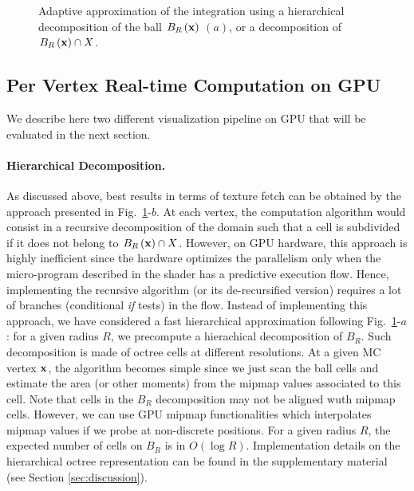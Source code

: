 \documentclass{llncs}
\begin{document}
\begin{figure}
  \begin{center}
  \end{center}
  \caption{Adaptive approximation of the integration using a
    hierarchical decomposition of the ball $B_{R}\left(\mathbf{x}\right)$ $(a)$, or a decomposition of $B_{R}\left(\mathbf{x}\right)\cap X$.}
  \label{fig:approx2}
\end{figure}


\subsection{Per Vertex Real-time Computation on GPU}

We describe here two different visualization pipeline on GPU that will
be evaluated in the next section.



\paragraph{Hierarchical Decomposition.}  As discussed above, best
results in terms of texture fetch can be obtained by the approach
presented in Fig.~\ref{fig:approx2}-$b$. At each vertex, the
computation algorithm would consist in a recursive decomposition of
the domain such that a cell is subdivided if it does not belong to
$B_{R}\left(\mathbf{x}\right)\cap X$. However, on GPU hardware, this approach is
highly inefficient since the hardware optimizes the parallelism only
when the micro-program described in the shader has a predictive
execution flow. Hence, implementing the recursive algorithm (or its
de-recursified version) requires a lot of branches (conditional
\emph{if} tests) in the flow. Instead of implementing this approach,
we have considered a fast hierarchical approximation following
Fig.~\ref{fig:approx2}-$a$: for a given radius $R$, we precompute a
hierachical decomposition of $B_R$. Such decomposition is made of
octree cells at different resolutions. At a given MC vertex $\mathbf{x}$, the
algorithm becomes simple since we just scan the ball cells and
estimate the area (or other moments) from the mipmap values associated
to this cell. Note that cells in the $B_R$ decomposition may not be
aligned wuth mipmap cells. However, we can use GPU mipmap
functionalities which interpolates mipmap values if we probe at
non-discrete positions. For a given radius $R$, the expected number of
cells on $B_R$ is in $O(\log{R})$. Implementation details on the
hierarchical octree representation can be found in the supplementary
material (see Section \ref{sec:discussion}).
\end{document}
